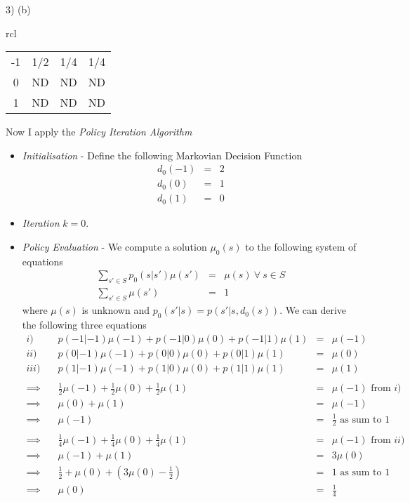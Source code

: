 \documentclass[11pt,a4paper]{article}
\begin{document}
\begin{answer}{3) (b)}
\begin{itemize}
\begin{center}
\begin{tabular}{rcl}
\begin{tabular}{c|ccc}
          -1&1/2&1/4&1/4\\
          0&ND&ND&ND\\
          1&ND&ND&ND
        \end{tabular}
      \end{tabular}
    \end{center}
  \end{itemize}
  Now I apply the \textit{Policy Iteration Algorithm}
  \begin{itemize}
    \item \textit{Initialisation} - Define the following Markovian Decision Function
    \[\begin{array}{rcl}
      d_0(-1)&=&2\\
      d_0(0)&=&1\\
      d_0(1)&=&0
    \end{array}\]
    \item \textit{Iteration} $k=0$.
    \item \textit{Policy Evaluation} - We compute a solution $\mu_0(s)$ to the following system of equations
    \[\begin{array}{rcl}
      \sum_{s'\in S}p_0(s|s')\mu(s')&=&\mu(s)\ \forall\ s\in S\\
      \sum_{s'\in S}\mu(s')&=&1
    \end{array}\]
    where $\mu(s)$ is unknown and $p_0(s'|s)=p(s'|s,d_0(s))$. We can derive the following three equations
    \[\begin{array}{rrcl}
      i)\quad&p(-1|-1)\mu(-1)+p(-1|0)\mu(0)+p(-1|1)\mu(1)&=&\mu(-1)\\
      ii)\quad&p(0|-1)\mu(-1)+p(0|0)\mu(0)+p(0|1)\mu(1)&=&\mu(0)\\
      iii)\quad&p(1|-1)\mu(-1)+p(1|0)\mu(0)+p(1|1)\mu(1)&=&\mu(1)\\\\
      \implies&\frac12\mu(-1)+\frac12\mu(0)+\frac12\mu(1)&=&\mu(-1)\text{ from }i)\\
      \implies&\mu(0)+\mu(1)&=&\mu(-1)\\
      \implies&\mu(-1)&=&\frac12\text{ as sum to 1}\\\\
      \implies&\frac14\mu(-1)+\frac14\mu(0)+\frac14\mu(1)&=&\mu(-1)\text{ from }ii)\\
      \implies&\mu(-1)+\mu(1)&=&3\mu(0)\\
      \implies&\frac12+\mu(0)+\left(3\mu(0)-\frac12\right)&=&1\text{ as sum to 1}\\
      \implies&\mu(0)&=&\frac14\\

\end{array}\]
\end{itemize}
\end{answer}
\end{document}
